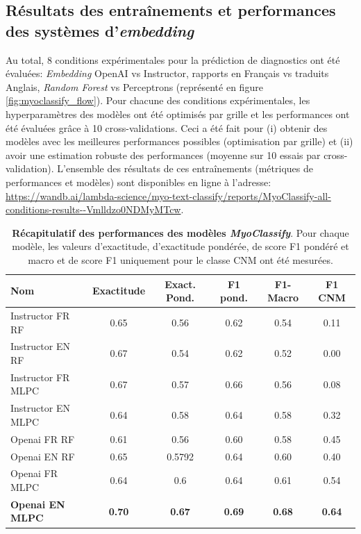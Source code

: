 \subsection{Résultats des entraînements et performances des systèmes d'\textit{embedding}}
Au total, 8 conditions expérimentales pour la prédiction de diagnostics ont été évaluées: \textit{Embedding} OpenAI vs Instructor, rapports en Français vs traduits Anglais, \textit{Random Forest} vs Perceptrons (représenté en figure \ref{fig:myoclassify_flow}). Pour chacune des conditions expérimentales, les hyperparamètres des modèles ont été optimisés par grille et les performances ont été évaluées grâce à 10 cross-validations. Ceci a été fait pour (i) obtenir des modèles avec les meilleures performances possibles (optimisation par grille) et (ii) avoir une estimation robuste des performances (moyenne sur 10 essais par cross-validation). L'ensemble des résultats de ces entraînements (métriques de performances et modèles) sont disponibles en ligne à l'adresse: \url{https://wandb.ai/lambda-science/myo-text-classify/reports/MyoClassify-all-conditions-results--Vmlldzo0NDMyMTcw}.
\begin{table}[!ht]
\centering
\caption[Récapitulatif des performances des modèles \textit{MyoClassify}]{\textbf{Récapitulatif des performances des modèles \textit{MyoClassify}}. Pour chaque modèle, les valeurs d'exactitude, d'exactitude pondérée, de score F1 pondéré et macro et de score F1 uniquement pour le classe CNM ont été mesurées.}
\label{tab:myoclassify_metrics}
\begin{tabularx}{\textwidth}{|X|c|c|c|c|c|}
\hline
\textbf{Nom} & \textbf{Exactitude} & \textbf{Exact. Pond.} & \textbf{F1 pond.} & \textbf{F1-Macro} & \textbf{F1 CNM} \\\hline
Instructor FR RF & 0.65 & 0.56 & 0.62 & 0.54 & 0.11 \\ \hline
Instructor EN RF & 0.67 & 0.54 & 0.62 & 0.52 & 0.00 \\ \hline
Instructor FR MLPC & 0.67 & 0.57 & 0.66 & 0.56 & 0.08 \\ \hline
Instructor EN MLPC & 0.64 & 0.58 & 0.64 & 0.58 & 0.32 \\ \hline
Openai FR RF & 0.61 & 0.56 & 0.60 & 0.58 & 0.45 \\ \hline
Openai EN RF & 0.65 & 0.5792 & 0.64 & 0.60 & 0.40 \\ \hline
Openai FR MLPC & 0.64 & 0.6 & 0.64 & 0.61 & 0.54 \\ \hline
\textbf{Openai EN MLPC} & \textbf{0.70} &\textbf{0.67}& \textbf{0.69} &\textbf{ 0.68} & \textbf{0.64} \\ \hline
\end{tabularx}
\end{table}

